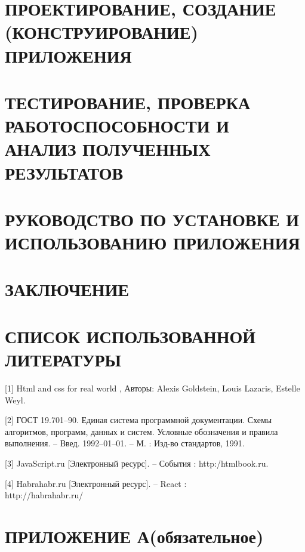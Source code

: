 \documentclass[a4paper,14pt]{extreport}
\begin{document}
\newpage
\section{\normalsize ПРОЕКТИРОВАНИЕ, СОЗДАНИЕ (КОНСТРУИРОВАНИЕ) ПРИЛОЖЕНИЯ}
\label{sec:pc}


\newpage
\section{ \normalsize ТЕСТИРОВАНИЕ, ПРОВЕРКА РАБОТОСПОСОБНОСТИ И АНАЛИЗ ПОЛУЧЕННЫХ РЕЗУЛЬТАТОВ}
\label{sec:test}


\newpage
\section{\normalsize РУКОВОДСТВО ПО УСТАНОВКЕ И ИСПОЛЬЗОВАНИЮ ПРИЛОЖЕНИЯ}


\newpage
\section*{\normalsize ЗАКЛЮЧЕНИЕ}


\newpage
\section*{\normalsize СПИСОК ИСПОЛЬЗОВАННОЙ ЛИТЕРАТУРЫ}
	
\hspace{1.25cm}[1] Html and css for real world , Авторы: Alexis Goldstein, Louis Lazaris, Estelle Weyl.

[2] ГОСТ 19.701–90. Единая система программной документации. Схемы алгоритмов, программ, данных и систем. Условные обозначения и правила выполнения. – Введ. 1992–01–01. – М. : Изд-во стандартов, 1991.

[3] JavaScript.ru [Электронный ресурс]. – События : http:/htmlbook.ru.


[4] Habrahabr.ru [Электронный ресурс]. – React : \\
 http://habrahabr.ru/
\newpage
\section*{\normalsize ПРИЛОЖЕНИЕ А(обязательное)}

\end{document}
